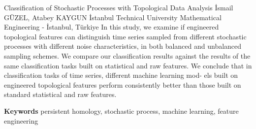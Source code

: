 
    \begin{abstract_online}{Classification of Stochastic Processes with Topological Data Analysis}{%
        İsmail GÜZEL, Atabey KAYGUN}{%
        }{%
        İstanbul Technical University Mathematical Engineering - İstanbul, Türkiye}
    In this study, we examine if engineered topological features can distinguish time series sampled from different stochastic processes with different noise characteristics, in both balanced and unbalanced sampling schemes. We compare our classification results against the results of the same classification tasks built on statistical and raw features. We conclude that in classification tasks of time series, different machine learning mod- els built on engineered topological features perform consistently better than those built on standard statistical and raw features. 
    
        \textbf{Keywords} \newline{}persistent homology, stochastic process, machine learning, feature engineering
    \end{abstract_online}
    